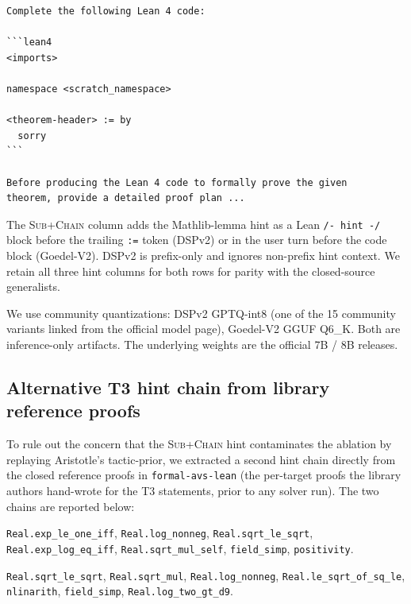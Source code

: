 \begin{lstlisting}[basicstyle=\ttfamily\small,breaklines=true,breakautoindent=false,columns=flexible]
Complete the following Lean 4 code:

```lean4
<imports>

namespace <scratch_namespace>

<theorem-header> := by
  sorry
```

Before producing the Lean 4 code to formally prove the given
theorem, provide a detailed proof plan ...
\end{lstlisting}

The \textsc{Sub+Chain} column adds the Mathlib-lemma hint as a Lean
\texttt{/- hint -/} block before the trailing \texttt{:=} token (DSPv2)
or in the user turn before the code block (Goedel-V2). DSPv2 is
prefix-only and ignores non-prefix hint context. We retain all three
hint columns for both rows for parity with the closed-source
generalists.

We use community quantizations: DSPv2 GPTQ-int8 (one of the 15
community variants linked from the official model page), Goedel-V2
GGUF Q$6$\_K. Both are inference-only artifacts. The underlying
weights are the official 7B / 8B releases.

\subsection{Alternative T3 hint chain from library reference proofs}
\label{app:alternative-hint-chain}

To rule out the concern that the \textsc{Sub+Chain} hint contaminates
the ablation by replaying Aristotle's tactic-prior, we extracted
a second hint chain directly from the closed reference proofs in
\texttt{formal-avs-lean} (the per-target proofs the library
authors hand-wrote for the T3 statements, prior to any solver
run). The two chains are reported below:

\begin{sloppypar}
\begin{description}[leftmargin=1.3em, itemsep=0.2em]
\item[\textsc{Sub+Chain} headline.]
\texttt{Real.exp\_le\_one\_iff}, \texttt{Real.log\_nonneg},
\texttt{Real.sqrt\_le\_sqrt}, \texttt{Real.exp\_log\_eq\_iff},
\texttt{Real.sqrt\_mul\_self}, \texttt{field\_simp},
\texttt{positivity}.
\item[Library reference proofs.]
\texttt{Real.sqrt\_le\_sqrt}, \texttt{Real.sqrt\_mul},
\texttt{Real.log\_nonneg}, \texttt{Real.le\_sqrt\_of\_sq\_le},
\texttt{nlinarith}, \texttt{field\_simp},
\texttt{Real.log\_two\_gt\_d9}.
\end{description}
\end{sloppypar}

